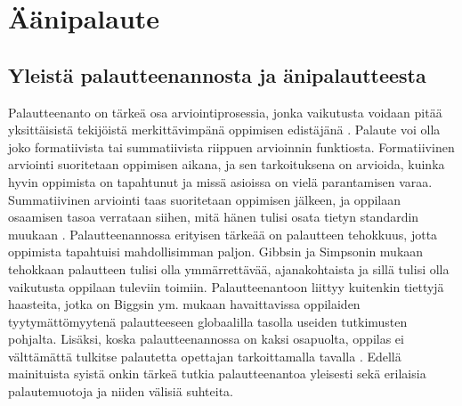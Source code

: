 \documentclass[utf8]{gradu3}
\begin{document}
\chapter{Äänipalaute}

\section{Yleistä palautteenannosta ja änipalautteesta}

Palautteenanto on tärkeä osa arviointiprosessia, jonka vaikutusta voidaan pitää yksittäisistä tekijöistä merkittävimpänä oppimisen edistäjänä \parencite[][]{gibbs2004}. Palaute voi olla joko formatiivista tai summatiivista riippuen arvioinnin funktiosta. Formatiivinen arviointi suoritetaan oppimisen aikana, ja sen tarkoituksena on arvioida, kuinka hyvin oppimista on tapahtunut ja missä asioissa on vielä parantamisen varaa. Summatiivinen arviointi taas suoritetaan oppimisen jälkeen, ja oppilaan osaamisen tasoa verrataan siihen, mitä hänen tulisi osata tietyn standardin muukaan \parencite[][]{biggs2011}. Palautteenannossa erityisen tärkeää on palautteen tehokkuus, jotta oppimista tapahtuisi mahdollisimman paljon. Gibbsin ja Simpsonin \parencite[][]{gibbs2004} mukaan tehokkaan palautteen tulisi olla ymmärrettävää, ajanakohtaista ja sillä tulisi olla vaikutusta oppilaan tuleviin toimiin. Palautteenantoon liittyy kuitenkin tiettyjä haasteita, jotka on Biggsin ym. \parencite[][]{biggs2011} mukaan havaittavissa oppilaiden tyytymättömyytenä palautteeseen globaalilla tasolla useiden tutkimusten pohjalta. Lisäksi, koska palautteenannossa on kaksi osapuolta, oppilas ei välttämättä tulkitse palautetta opettajan tarkoittamalla tavalla \parencite[][]{sadler2010}. Edellä mainituista syistä onkin tärkeä tutkia palautteenantoa yleisesti sekä erilaisia palautemuotoja ja niiden välisiä suhteita. 
\end{document}
